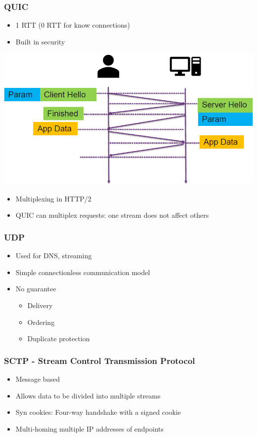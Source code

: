 \subsubsection{QUIC}
\begin{itemize}
    \item 1 RTT (0 RTT for know connections)
    \item Built in security
\end{itemize}
\includegraphics[width=0.8\linewidth]{img/quic.png}
\begin{itemize}
    \item Multiplexing in HTTP/2
    \item QUIC can multiplex requests: one stream does not affect others
\end{itemize}

\subsubsection{UDP}
\begin{itemize}
    \item Used for DNS, streaming
    \item Simple connectionless communication model
    \item No guarantee
    \begin{itemize}
        \item Delivery
        \item Ordering
        \item Duplicate protection
    \end{itemize}
\end{itemize}

\subsubsection{SCTP - Stream Control Transmission Protocol}
\begin{itemize}
    \item Message based
    \item Allows data to be divided into multiple streams
    \item Syn cookies: Four-way handshake with a signed cookie
    \item Multi-homing multiple IP addresses of endpoints
\end{itemize}